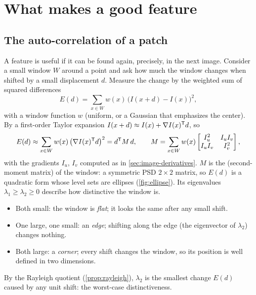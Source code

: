 \section{What makes a good feature}

\subsection{The auto-correlation of a patch}

A feature is useful if it can be found again, precisely, in the next image. Consider a small window $W$ around a point and ask how much the window changes when
shifted by a small displacement $d$. Measure the change by the weighted sum of squared differences
\begin{equation}
  E(d) = \sum_{x\in W}w(x)\,\big(I(x + d) - I(x)\big)^2,
\end{equation}
with a window function $w$ (uniform, or a Gaussian that emphasizes the center). By a first-order Taylor expansion $I(x + d) \approx I(x) + \nabla I(x)^{\mathsf{T}} d$, so
\begin{equation}
  E(d) \approx \sum_{x\in W}w(x)\,\big(\nabla I(x)^{\mathsf{T}} d\big)^2 = d^{\mathsf{T}} M\,d,
  \qquad
  M = \sum_{x\in W}w(x)\begin{bmatrix} I_u^2 & I_uI_v \\ I_uI_v & I_v^2 \end{bmatrix},
  \label{eq:structure-tensor}
\end{equation}
with the gradients $I_u$, $I_v$ computed as in \cref{sec:image-derivatives}. $M$ is the  (second-moment matrix) of the window: a symmetric PSD
$2\times2$ matrix, so $E(d)$ is a quadratic form whose level sets are ellipses (\cref{fig:ellipse}). Its eigenvalues $\lambda_1 \ge \lambda_2 \ge 0$ describe how distinctive the
window is.
\begin{itemize}
  \item Both small: the window is \emph{flat}; it looks the same after any small shift.
  \item One large, one small: an \emph{edge}; shifting along the edge (the eigenvector of $\lambda_2$) changes nothing.
  \item Both large: a \emph{corner}; every shift changes the window, so its position is well defined in two dimensions.
\end{itemize}
By the Rayleigh quotient (\cref{prop:rayleigh}), $\lambda_2$ is the smallest change $E(d)$ caused by any unit shift: the worst-case distinctiveness.

